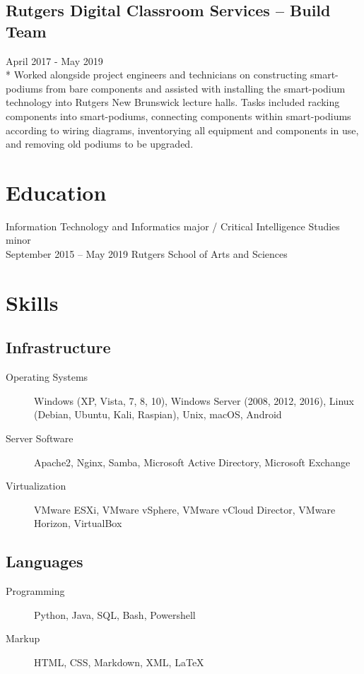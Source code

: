 \documentclass{article}
\begin{document}
\begin{samepage}
\subsection{Rutgers Digital Classroom Services -- Build Team}
April 2017 - May 2019\\*
Worked alongside project engineers and technicians on constructing smart-podiums from bare components and assisted with installing the smart-podium technology into Rutgers New Brunswick lecture halls. Tasks included racking components into smart-podiums, connecting components within smart-podiums according to wiring diagrams, inventorying all equipment and components in use, and removing old podiums to be upgraded.


\section{Education}
Information Technology and Informatics major /  
Critical Intelligence Studies minor \\
September 2015 -- May 2019
Rutgers School of Arts and Sciences

\section{Skills}

\subsection{Infrastructure} 
\begin{description}
\item[Operating Systems] Windows (XP, Vista, 7, 8, 10), Windows Server (2008, 2012, 2016), Linux (Debian, Ubuntu, Kali, Raspian), Unix,  macOS, Android
\item[Server Software] Apache2, Nginx, Samba, Microsoft Active Directory, Microsoft Exchange    
\item[Virtualization] VMware ESXi, VMware vSphere, VMware vCloud Director, VMware Horizon, VirtualBox
\end{description}	

\subsection{Languages}
\begin{description}
\item[Programming] Python, Java, SQL, Bash, Powershell
\item[Markup] HTML, CSS, Markdown, XML, {\LaTeX}
\end{description}


\end{samepage}
\end{document}

